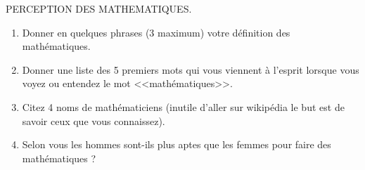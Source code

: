 \documentclass{article}
\begin{document}
PERCEPTION DES MATHEMATIQUES.
  \begin{enumerate}
  \item Donner en quelques phrases (3 maximum) votre définition des
    mathématiques.
  \item Donner une liste des 5 premiers mots qui vous viennent à l'esprit
    lorsque vous voyez ou entendez le mot <<mathématiques>>. 
  \item Citez 4 noms de mathématiciens (inutile d'aller sur wikipédia
    le but est de savoir ceux que vous connaissez). 
  \item Selon vous les hommes sont-ils plus aptes que les femmes pour
    faire des mathématiques ? 


\end{enumerate}
\end{document}
